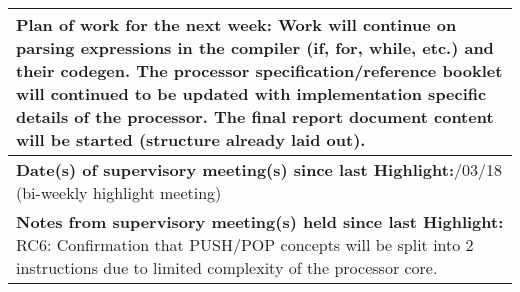 \begin{table}[H]
\begin{tabularx}{\textwidth}{|X|}
	
	
	\textbf{Plan of work for the next week:}\newline
	Work will continue on parsing expressions in the compiler (if, for, while, etc.) and their codegen.
	\newline\newline
	The processor specification/reference booklet will continued to be updated with implementation specific details of the processor.
	\newline\newline
	The final report document content will be started (structure already laid out).
	\\ \hline
	
	
	\textbf{Date(s) of supervisory meeting(s) since last Highlight:}\newline
	12/03/18 (bi-weekly highlight meeting)
	\\ \hline
	
	
	\textbf{Notes from supervisory meeting(s) held since last Highlight:}\newline
	RC6: Confirmation that PUSH/POP concepts will be split into 2 instructions due to limited complexity of the processor core.
	\\ \hline
    \end{tabularx}
\end{table}


\newpage

